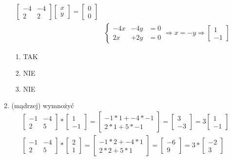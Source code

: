 \begin{enumerate}[label=\alph*)]
\begin{enumerate}[label=\Roman*:]
\begin{align*}
\begin{bmatrix}
-4 & -4\\ 2 & 2
\end{bmatrix} \begin{bmatrix}
x\\y
\end{bmatrix}=\begin{bmatrix}
0\\0
\end{bmatrix}\\
&\left\{\begin{matrix}
-4x &-4y &= 0\\
2x &+ 2y &= 0
\end{matrix}\right. \Rightarrow x=-y \Rightarrow \begin{bmatrix}
1\\-1
\end{bmatrix}
\end{align*}
\begin{enumerate}[label=\alph*)]
\item TAK
\item NIE
\item NIE
\end{enumerate}
\item (mądrzej) wymnożyć
\begin{align*}
&\begin{bmatrix}
-1 & -4\\
2 & 5
\end{bmatrix} * \begin{bmatrix}
1\\-1
\end{bmatrix}=\begin{bmatrix}
-1*1+-4*-1\\
2*1+5*-1
\end{bmatrix}= \begin{bmatrix}
3\\
-3
\end{bmatrix}=3\begin{bmatrix}
1\\-1
\end{bmatrix} \\
& \begin{bmatrix}
-1 & -4\\
2 & 5
\end{bmatrix} * \begin{bmatrix}
2\\1
\end{bmatrix} = \begin{bmatrix}
-1*2+-4*1 \\
2*2+5*1
\end{bmatrix} = \begin{bmatrix}
-6\\
9
\end{bmatrix}=3*\begin{bmatrix}
-2\\3
\end{bmatrix}
\end{align*}


\end{enumerate}
\end{enumerate}
